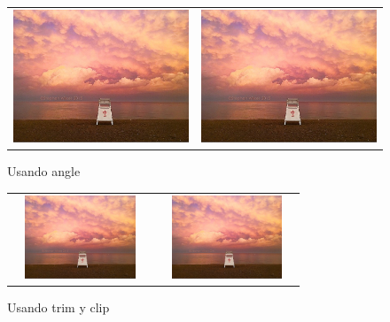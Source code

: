 \documentclass{article}
\begin{document}
\begin{figure}[h] 
\centering
\begin{tabular}{cc} 
\includegraphics[scale=0.1, angle=40]{lago}& 
\includegraphics[scale=0.1, angle=20]{lago} 
\end{tabular} 
\caption{Usando angle} 
\end{figure} 

\begin{figure}[!]
\centering
\begin{tabular}{cc} 
\includegraphics[height=2.5cm, width=4cm, trim={4cm 8cm 4cm 2cm}, clip]{lago}&  \includegraphics[height=2.5cm, width=4cm]{lago} 
\end{tabular} 
\caption{Usando trim y clip} 
\end{figure}
\end{document}
